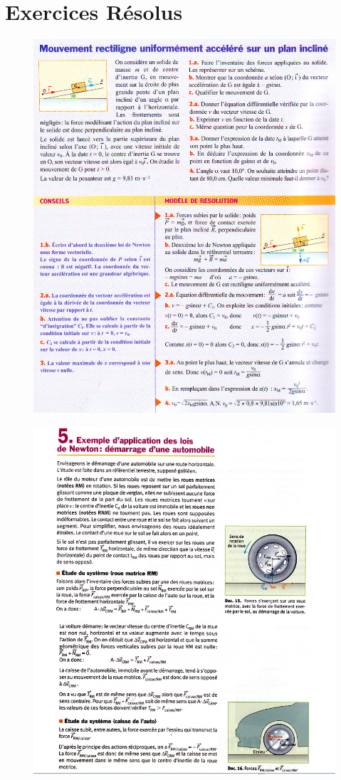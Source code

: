 \documentclass[11pt,a4paper]{article}
\begin{document}
\section{Exercices Résolus}
\begin{figure}[h]
    \centering
    \includegraphics[width=.9\textwidth]{imgs/p2/xo2.jpg}
\end{figure}

\begin{figure}[h]
    \centering
    \includegraphics[width=\textwidth]{imgs/p2/xo1.jpg}
\end{figure}
\end{document}
